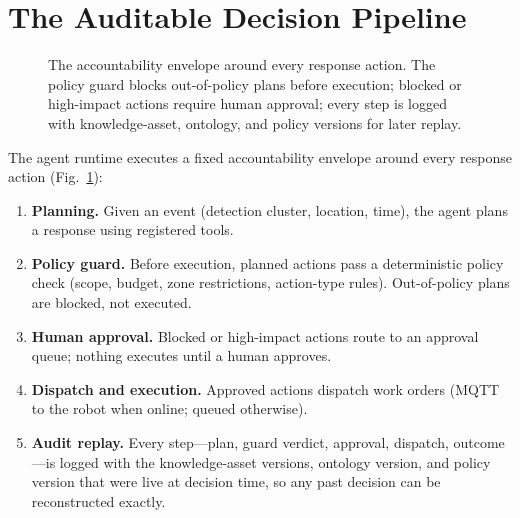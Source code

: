 \documentclass[conference]{IEEEtran}
\begin{document}
\section{The Auditable Decision Pipeline}
\label{sec:pipeline}

\begin{figure}[t]
\centering
{}
\caption{The accountability envelope around every response action. The
policy guard blocks out-of-policy plans before execution; blocked or
high-impact actions require human approval; every step is logged with
knowledge-asset, ontology, and policy versions for later replay.}
\label{fig:pipeline}
\end{figure}
The agent runtime executes a fixed accountability envelope around every
response action (Fig.~\ref{fig:pipeline}):

\begin{enumerate}
\item \textbf{Planning.} Given an event (detection cluster, location,
time), the agent plans a response using registered tools.
\item \textbf{Policy guard.} Before execution, planned actions pass a
deterministic policy check (scope, budget, zone restrictions, action-type
rules). Out-of-policy plans are blocked, not executed.
\item \textbf{Human approval.} Blocked or high-impact actions route to an
approval queue; nothing executes until a human approves.
\item \textbf{Dispatch and execution.} Approved actions dispatch work
orders (MQTT to the robot when online; queued otherwise).
\item \textbf{Audit replay.} Every step---plan, guard verdict, approval,
dispatch, outcome---is logged with the knowledge-asset versions, ontology
version, and policy version that were live at decision time, so any past
decision can be reconstructed exactly.
\end{enumerate}
\end{document}

